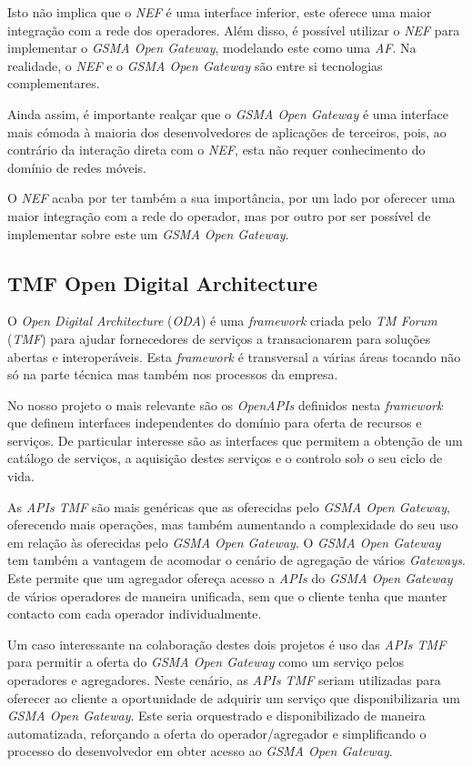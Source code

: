 Isto não implica que o \emph{NEF} é uma interface inferior, este oferece uma
maior integração com a rede dos operadores. Além disso, é possível utilizar o
\emph{NEF} para implementar o \emph{GSMA Open Gateway}, modelando este como uma
\emph{AF}. Na realidade, o \emph{NEF} e o \emph{GSMA Open Gateway} são entre si
tecnologias complementares.

Ainda assim, é importante realçar que o \emph{GSMA Open Gateway} é uma
interface mais cómoda à maioria dos desenvolvedores de aplicações de terceiros,
pois, ao contrário da interação direta com o \emph{NEF}, esta não requer
conhecimento do domínio de redes móveis.

O \emph{NEF} acaba por ter também a sua importância, por um lado por oferecer
uma maior integração com a rede do operador, mas por outro por ser possível de
implementar sobre este um \emph{GSMA Open Gateway}.

\subsection{TMF Open Digital Architecture}

O \emph{Open Digital Architecture} (\emph{ODA}) é uma \emph{framework} criada
pelo \emph{TM Forum} (\emph{TMF}) para ajudar fornecedores de serviços a
transacionarem para soluções abertas e interoperáveis. Esta \emph{framework} é
transversal a várias áreas tocando não só na parte técnica mas também nos
processos da empresa.

No nosso projeto o mais relevante são os \emph{OpenAPIs} definidos nesta
\emph{framework} que definem interfaces independentes do domínio para oferta de
recursos e serviços. De particular interesse são as interfaces que permitem a
obtenção de um catálogo de serviços, a aquisição destes serviços e o controlo sob
o seu ciclo de vida.

As \emph{APIs TMF} são mais genéricas que as oferecidas pelo \emph{GSMA Open
	Gateway}, oferecendo mais operações, mas também aumentando a complexidade do
seu uso em relação às oferecidas pelo \emph{GSMA Open Gateway}. O \emph{GSMA
	Open Gateway} tem também a vantagem de acomodar o cenário de agregação de
vários \emph{Gateways}. Este permite que um agregador ofereça acesso a
\emph{APIs} do \emph{GSMA Open Gateway} de vários operadores de maneira
unificada, sem que o cliente tenha que manter contacto com cada operador
individualmente.

Um caso interessante na colaboração destes dois projetos é uso das \emph{APIs
	TMF} para permitir a oferta do \emph{GSMA Open Gateway} como um serviço pelos
operadores e agregadores. Neste cenário, as \emph{APIs TMF} seriam utilizadas
para oferecer ao cliente a oportunidade de adquirir um serviço que
disponibilizaria um \emph{GSMA Open Gateway}. Este seria orquestrado e 
disponibilizado de maneira automatizada, reforçando a oferta do operador/agregador e
simplificando o processo do desenvolvedor em obter acesso ao \emph{GSMA Open
	Gateway}.



